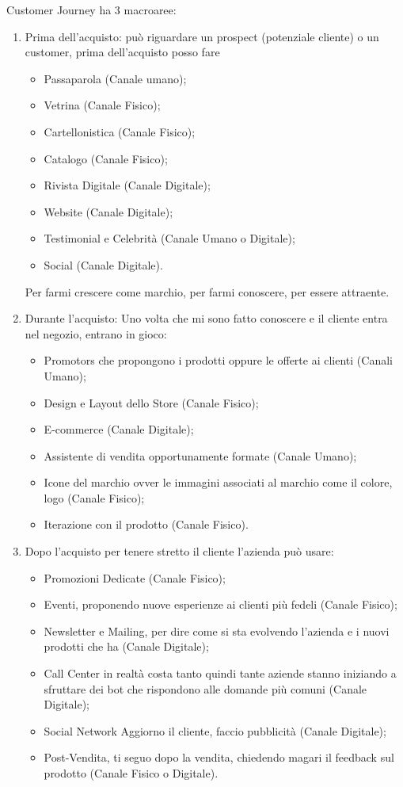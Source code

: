 \documentclass[11pt]{article}
\begin{document}
Customer Journey ha 3 macroaree:
\begin{enumerate}[noitemsep,topsep=0ex]
	\item Prima dell'acquisto: può riguardare un prospect (potenziale cliente) o un customer, prima dell'acquisto posso fare
	\begin{itemize}[noitemsep,topsep=0ex]
		\item Passaparola (Canale umano);
		\item Vetrina (Canale Fisico);
		\item Cartellonistica (Canale Fisico);
		\item Catalogo (Canale Fisico);
		\item Rivista Digitale (Canale Digitale);
		\item Website (Canale Digitale);
		\item Testimonial e Celebrità (Canale Umano o Digitale);
		\item Social (Canale Digitale).
	\end{itemize}
	Per farmi crescere come marchio, per farmi conoscere, per essere attraente.
	
	\item Durante l'acquisto: Uno volta che mi sono fatto conoscere e il cliente entra nel negozio, entrano in gioco:
	\begin{itemize}[noitemsep,topsep=0ex]
		\item Promotors che propongono i prodotti oppure le offerte ai clienti (Canali Umano); 
		\item Design e Layout dello Store (Canale Fisico); 
		\item E-commerce (Canale Digitale); 
		\item Assistente di vendita opportunamente formate (Canale Umano);
		\item Icone del marchio ovver le immagini associati al marchio come il colore, logo (Canale Fisico);
		\item Iterazione con il prodotto (Canale Fisico).
	\end{itemize} 
	
	\item Dopo l'acquisto per tenere stretto il cliente l'azienda può usare: 
	\begin{itemize}
		\item Promozioni Dedicate (Canale Fisico); 
		\item Eventi, proponendo nuove esperienze ai clienti più fedeli (Canale Fisico); 
		\item Newsletter e Mailing, per dire come si sta evolvendo l'azienda e i nuovi prodotti che ha (Canale Digitale);
		\item Call Center in realtà costa tanto quindi tante aziende stanno iniziando a sfruttare dei bot che rispondono alle domande più comuni (Canale Digitale);
		\item Social Network Aggiorno il cliente, faccio pubblicità (Canale Digitale); 
		\item Post-Vendita, ti seguo dopo la vendita, chiedendo magari il feedback sul prodotto (Canale Fisico o Digitale).
	\end{itemize}
\end{enumerate}
\end{document}
